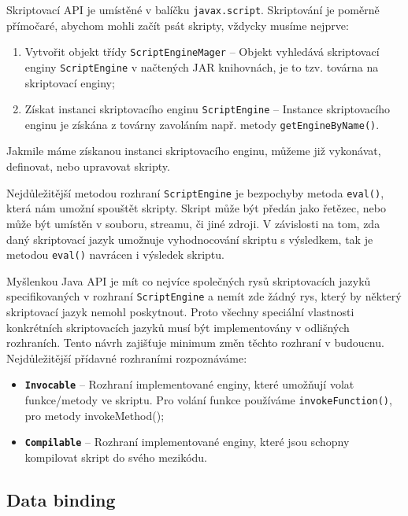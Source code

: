 \bigskip \noindent Skriptovací API je umístěné v balíčku \texttt{javax.script}. Skriptování je poměrně přímočaré, abychom mohli začít psát skripty, vždycky musíme nejprve:

\begin{enumerate}
  \item Vytvořit objekt třídy \texttt{ScriptEngineMager} -- Objekt vyhledává skriptovací enginy \texttt{ScriptEngine} v načtených JAR knihovnách, je to tzv. továrna na skriptovací enginy;
  \item Získat instanci skriptovacího enginu \texttt{ScriptEngine} -- Instance skriptovacího enginu je získána z továrny zavoláním např. metody \texttt{getEngineByName()}. 
\end{enumerate}

Jakmile máme získanou instanci skriptovacího enginu, můžeme již vykonávat, definovat, nebo upravovat skripty.

Nejdůležitější metodou rozhraní \texttt{ScriptEngine} je bezpochyby metoda \texttt{eval()}, která nám umožní spouštět skripty. Skript může být předán jako řetězec, nebo může být umístěn v souboru, streamu, či jiné zdroji. V závislosti na tom, zda daný skriptovací jazyk umožnuje vyhodnocování skriptu s výsledkem, tak je metodou \texttt{eval()} navrácen i výsledek skriptu.

Myšlenkou Java API je mít co nejvíce společných rysů skriptovacích jazyků specifikovaných v rozhraní \texttt{ScriptEngine} a nemít zde žádný rys, který by některý skriptovací jazyk nemohl poskytnout. Proto všechny speciální vlastnosti konkrétních skriptovacích jazyků musí být implementovány v odlišných rozhraních. Tento návrh zajišťuje minimum změn těchto rozhraní v budoucnu. Nejdůležitější přídavné rozhraními rozpoznáváme:

\begin{itemize}
  \item \textbf{\texttt{Invocable}} -- Rozhraní implementované enginy, které umožňují volat funkce/metody ve skriptu. Pro volání funkce používáme \texttt{invokeFunction()}, pro metody invokeMethod();
  \item \textbf{\texttt{Compilable}} -- Rozhraní implementované enginy, které jsou schopny kompilovat skript do svého mezikódu.
\end{itemize}

\subsection{Data binding}
\label{Chapter.JavaScriptInJavaAnalysis.ScriptingJavaAPI.DataBinding}

